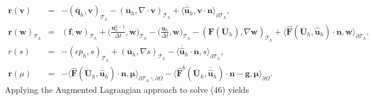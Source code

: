 \documentclass[11pt]{article}
\begin{document}
\begin{equation}
\begin{array}{rcl}
 \bm{r}(\bm{v}) & = & -(\overline{\bm{q}}_h, \bm{v})_{\mathcal{T}_h} - (\overline{\bm{u}}_h, \nabla \cdot \bm{v})_{\mathcal{T}_h} + \langle \overline{\widehat{\bm{u}}}_h, \bm{v} \cdot \bm{n} \rangle_{\partial \mathcal{T}_h},  \\[2ex]
\bm{r}(\bm{w})_{\mathcal{T}_h} & = & (\bm{f}, \bm{w})_{\mathcal{T}_h} + \displaystyle \Big(\frac{\bm{u}_h^{k-1}}{\Delta t}, \bm{w} \Big)_{\mathcal{T}_h} -\displaystyle \Big(\frac{\bm{u}_h}{\Delta t}, \bm{w} \Big)_{\mathcal{T}_h} - (\bm{F} (\overline{\bm{U}}_h), \nabla \bm{w})_{\mathcal{T}_h} + \langle \widehat{\bm{F}} (\overline{\bm{U}}_h, \overline{\widehat{\bm{u}}}_h) \cdot \bm{n}, \bm{w} \rangle_{\partial \mathcal{T}_h} , \\[2ex]
r(s) & = & -(\epsilon \overline{p}_h, s)_{\mathcal{T}_h} + (\overline{\bm{u}}_h, \nabla s)_{\mathcal{T}_h} - \langle \overline{\widehat{\bm{u}}}_h \cdot \bm{n},s \rangle_{\partial \mathcal{T}_h} ,\\[2ex]
\bm{r}(\mu) & = & - \langle \widehat{\bm{F}} (\overline{\bm{U}}_h, \overline{\widehat{\bm{u}}}_h) \cdot \bm{n}, \bm{\mu} \rangle_{\partial \mathcal{T}_h \backslash \partial \Omega} - \langle \widehat{\bm{F}}^b(\overline{\bm{U}}_h,\overline{\widehat{\bm{u}}}_h) \cdot \bm{n} - \bm{g}, \bm{\mu} \rangle_{\partial \Omega} .
\end{array}
\end{equation}
Applying the Augmented Lagrangian approach to solve (46) yields
\end{document}

